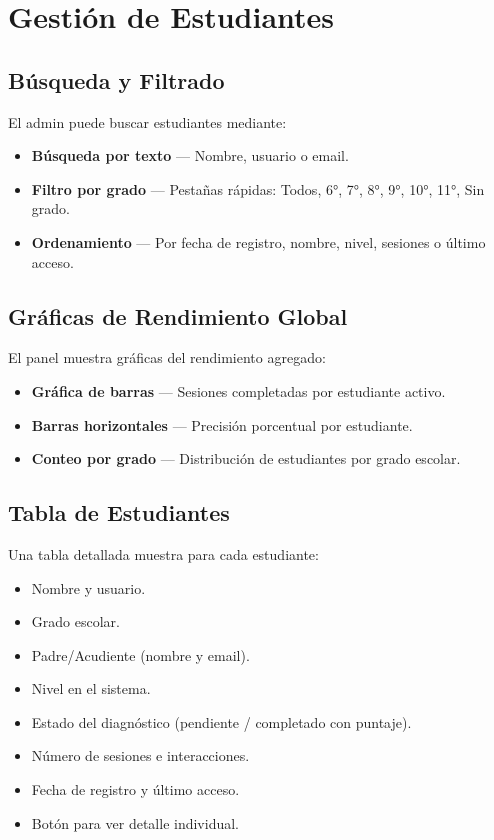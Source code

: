 \documentclass[12pt, a4paper, oneside]{book}
\begin{document}
\section{Gestión de Estudiantes}

\subsection{Búsqueda y Filtrado}

El admin puede buscar estudiantes mediante:
\begin{itemize}
    \item \textbf{Búsqueda por texto} — Nombre, usuario o email.
    \item \textbf{Filtro por grado} — Pestañas rápidas: Todos, 6°, 7°, 8°, 9°, 10°, 11°, Sin grado.
    \item \textbf{Ordenamiento} — Por fecha de registro, nombre, nivel, sesiones o último acceso.
\end{itemize}

\subsection{Gráficas de Rendimiento Global}

El panel muestra gráficas del rendimiento agregado:
\begin{itemize}
    \item \textbf{Gráfica de barras} — Sesiones completadas por estudiante activo.
    \item \textbf{Barras horizontales} — Precisión porcentual por estudiante.
    \item \textbf{Conteo por grado} — Distribución de estudiantes por grado escolar.
\end{itemize}

\subsection{Tabla de Estudiantes}

Una tabla detallada muestra para cada estudiante:
\begin{itemize}
    \item Nombre y usuario.
    \item Grado escolar.
    \item Padre/Acudiente (nombre y email).
    \item Nivel en el sistema.
    \item Estado del diagnóstico (pendiente / completado con puntaje).
    \item Número de sesiones e interacciones.
    \item Fecha de registro y último acceso.
    \item Botón para ver detalle individual.
\end{itemize}
\end{document}

